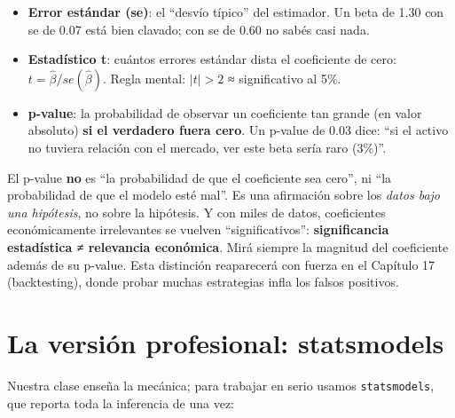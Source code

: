 \documentclass[
  spanish,
  letterpaper,
  DIV=11,
  numbers=noendperiod]{scrreprt}
\providecommand{\tightlist}{%
  \setlength{\itemsep}{0pt}\setlength{\parskip}{0pt}}
\begin{document}
\begin{itemize}
\tightlist
\item
  \textbf{Error estándar (se)}: el ``desvío típico'' del estimador. Un
  beta de 1.30 con se de 0.07 está bien clavado; con se de 0.60 no sabés
  casi nada.
\item
  \textbf{Estadístico t}: cuántos errores estándar dista el coeficiente
  de cero: \(t = \hat\beta / se(\hat\beta)\). Regla mental: \(|t| > 2\)
  ≈ significativo al 5\%.
\item
  \textbf{p-value}: la probabilidad de observar un coeficiente tan
  grande (en valor absoluto) \textbf{si el verdadero fuera cero}. Un
  p-value de 0.03 dice: ``si el activo no tuviera relación con el
  mercado, ver este beta sería raro (3\%)''.
\end{itemize}

\begin{tcolorbox}[enhanced jigsaw, bottomrule=.15mm, colback=white, opacitybacktitle=0.6, arc=.35mm, toprule=.15mm, opacityback=0, breakable, titlerule=0mm, left=2mm, coltitle=black, colbacktitle=quarto-callout-warning-color!10!white, colframe=quarto-callout-warning-color-frame, leftrule=.75mm, toptitle=1mm, bottomtitle=1mm, title=\textcolor{quarto-callout-warning-color}{\faExclamationTriangle}\hspace{0.5em}{Lo que el p-value NO dice}, rightrule=.15mm]

El p-value \textbf{no} es ``la probabilidad de que el coeficiente sea
cero'', ni ``la probabilidad de que el modelo esté mal''. Es una
afirmación sobre los \emph{datos bajo una hipótesis}, no sobre la
hipótesis. Y con miles de datos, coeficientes económicamente
irrelevantes se vuelven ``significativos'': \textbf{significancia
estadística ≠ relevancia económica}. Mirá siempre la magnitud del
coeficiente además de su p-value. Esta distinción reaparecerá con fuerza
en el Capítulo 17 (backtesting), donde probar muchas estrategias infla
los falsos positivos.

\end{tcolorbox}

\section{La versión profesional:
statsmodels}\label{la-versiuxf3n-profesional-statsmodels}

Nuestra clase enseña la mecánica; para trabajar en serio usamos
\texttt{statsmodels}, que reporta toda la inferencia de una vez:
\end{document}
